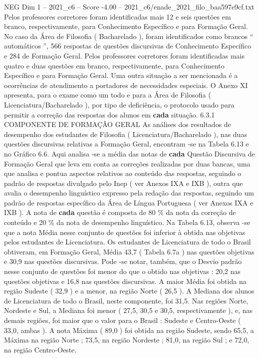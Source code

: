 \begin{textsample}{NEG Dim 1 – 2021\_c6 – Score -4.00 – 2021\_c6/enade\_2021\_filo\_baa597e9cf.txt}
Pelos professores corretores foram identificadas mais 12 e seis questões em branco, respectivamente, para Conhecimento Específico e para Formação Geral.
No caso da Área de Filosofia ( Bacharelado ), foram identificados como brancos “ automáticos ”, 566 respostas de questões discursivas de Conhecimento Específico e 284 de Formação Geral.
Pelos professores corretores foram identificadas mais quatro e duas questões em branco, respectivamente, para Conhecimento Específico e para Formação Geral.
Uma outra situação a ser mencionada é a ocorrências de atendimento a portadores de necessidades especiais.
O Anexo XI apresenta, para o exame como um todo e para a Área de Filosofia ( Licenciatura/Bacharelado ), por tipo de deficiência, o protocolo usado para permitir a correção das respostas dos alunos em \textbf{cada} situação. 6.3.1 COMPONENTE DE FORMAÇÃO GERAL As análises dos resultados de desempenho dos estudantes de Filosofia ( Licenciatura/Bacharelado ), nas duas questões discursivas relativas a Formação Geral, encontram -se na Tabela 6.13 e no Gráfico 6.6.
Aqui analisa -se a média das notas de \textbf{cada} Questão Discursiva de Formação Geral que leva em conta as correções realizadas por duas bancas, uma que analisa e pontua aspectos relativos ao conteúdo das respostas, seguindo o padrão de respostas divulgado pelo Inep ( ver Anexos IXA e IXB ), outra que avalia o desempenho linguístico expresso pela redação das respostas, seguindo um padrão de respostas específico da Área de Língua Portuguesa ( ver Anexos IXA e IXB ).
A nota de \textbf{cada} questão é composta de 80 \% da nota da correção de conteúdo e 20 \% da nota de desempenho linguístico.
Na Tabela 6.13, observa -se que a nota Média nesse conjunto de questões foi inferior à obtida nas objetivas pelos estudantes de Licenciatura.
Os estudantes de Licenciatura de todo o Brasil obtiveram, em Formação Geral, Média 43,7 ( Tabela 6.7a ) nas questões objetivas e 30,9 nas questões discursivas.
Pode -se notar, também, que o Desvio padrão nesse conjunto de questões foi menor do que o obtido nas objetivas : 20,2 nas questões objetivas e 16,8 nas questões discursivas.
A maior Média foi obtida na região Sudeste ( 32,9 ) e a menor, na região Norte ( 26,5 ).
A Mediana dos alunos de Licenciatura de todo o Brasil, neste componente, foi 31,5.
Nas regiões Norte, Nordeste e Sul, a Mediana foi menor ( 27,5, 30,5 e 30,5, respectivamente ), e, nas demais regiões, foi maior que o valor para o Brasil : Sudeste e Centro-Oeste ( 33,0, ambas ).
A nota Máxima ( 89,0 ) foi obtida na região Sudeste, sendo 65,5, a Máxima na região Norte ; 73,5, na região Nordeste ; 81,0, na região Sul ; e 72,0, na região Centro-Oeste.

\end{textsample}
